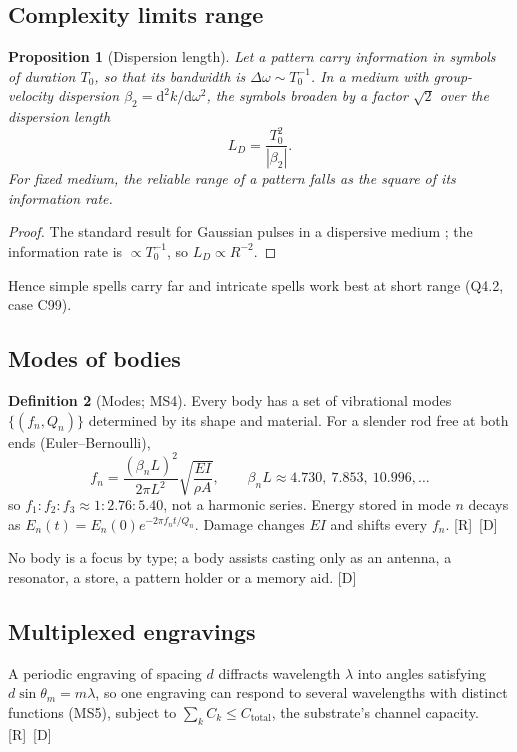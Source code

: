 \documentclass[11pt,a4paper]{article}
\numberwithin{equation}{section}
\theoremstyle{definition}
\newtheorem{definition}{Definition}[section]
\theoremstyle{plain}
\newtheorem{proposition}[definition]{Proposition}
\theoremstyle{remark}
\newcommand{\dd}{\mathrm d}
\newcommand{\abs}[1]{\left\lvert #1\right\rvert}
\newcommand{\tagD}{\textcolor{tag}{\textsf{[D]}}}
\newcommand{\tagR}{\textcolor{tag}{\textsf{[R]}}}
\begin{document}
\subsection{Complexity limits range}
\begin{proposition}[Dispersion length]\label{prop:disp}
Let a pattern carry information in symbols of duration $T_0$, so that its bandwidth is $\Delta\omega\sim T_0^{-1}$. In a medium with group-velocity dispersion $\beta_2=\dd^2k/\dd\omega^2$, the symbols broaden by a factor $\sqrt2$ over the dispersion length
\begin{equation}
L_D=\frac{T_0^2}{\abs{\beta_2}} .
\end{equation}
For fixed medium, the reliable range of a pattern falls as the square of its information rate.
\end{proposition}
\begin{proof}
The standard result for Gaussian pulses in a dispersive medium \cite{agrawal}; the information rate is $\propto T_0^{-1}$, so $L_D\propto R^{-2}$.
\end{proof}
Hence simple spells carry far and intricate spells work best at short range (Q4.2, case C99).

\subsection{Modes of bodies}
\begin{definition}[Modes; MS4]
Every body has a set of vibrational modes $\{(f_n,Q_n)\}$ determined by its shape and material. For a slender rod free at both ends (Euler--Bernoulli),
\begin{equation}
f_n=\frac{(\beta_nL)^2}{2\pi L^2}\sqrt{\frac{EI}{\rho A}},\qquad \beta_nL\approx4.730,\ 7.853,\ 10.996,\dots
\end{equation}
so $f_1:f_2:f_3\approx1:2.76:5.40$, not a harmonic series. Energy stored in mode $n$ decays as $E_n(t)=E_n(0)e^{-2\pi f_n t/Q_n}$. Damage changes $EI$ and shifts every $f_n$. \tagR\ \tagD
\end{definition}
No body is a focus by type; a body assists casting only as an antenna, a resonator, a store, a pattern holder or a memory aid. \tagD

\subsection{Multiplexed engravings}
A periodic engraving of spacing $d$ diffracts wavelength $\lambda$ into angles satisfying $d\sin\theta_m=m\lambda$, so one engraving can respond to several wavelengths with distinct functions (MS5), subject to $\sum_k C_k\le C_{\text{total}}$, the substrate's channel capacity. \tagR\ \tagD
\end{document}

